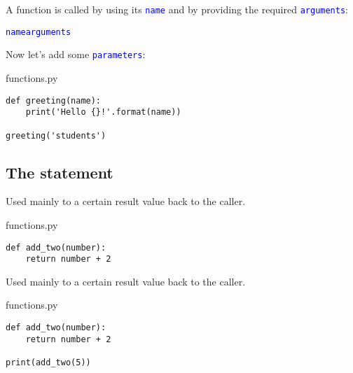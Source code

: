 \documentclass[aspectratio=1610,slidestop]{beamer}
\newcommand{\decl}[1]{\textcolor{blue}{\lstinline{#1}}}
\begin{document}
\begin{pframe}
 A function is called by using its \decl{name} and by providing the required
 \decl{arguments}:
 \begin{pythondeclaration}
  \decl{name}\emp{(}\decl{arguments}\emp{)}
 \end{pythondeclaration}
 Now let's add some \decl{parameters}:
 \vspace{0.1cm}

 \begin{minipage}[t]{0.49\textwidth}
  \begin{pythonfile}{functions.py}
   \begin{verbatim}
def greeting(name):
    print('Hello {}!'.format(name))

greeting('students')
   \end{verbatim}
  \end{pythonfile}
 \end{minipage}\qquad
 \begin{minipage}[t]{0.47\textwidth}
 \vspace{-2.55cm}
 \begin{terminal}
 \end{terminal}
 \end{minipage}
\end{pframe}


\subsection{The  statement}

\begin{pframe}
 Used mainly to  a certain result value back to the caller.
 \begin{pythonfile}{functions.py}
  \begin{verbatim}
def add_two(number):
    return number + 2
  \end{verbatim}
 \end{pythonfile}
\end{pframe}


\begin{pframe}
 Used mainly to  a certain result value back to the caller.
 \begin{pythonfile}{functions.py}
  \begin{verbatim}
def add_two(number):
    return number + 2

print(add_two(5))
  \end{verbatim}
 \end{pythonfile}
\end{pframe}
\end{document}
